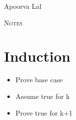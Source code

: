 \documentclass{article}
\begin{document}
\begin{flushright}
Apoorva Lal
\end{flushright}

\begin{center}
\Large \textsc{Notes} \\
\end{center}

\section{Induction} %
\label{sec:induction}

\begin{itemize}
  \item Prove base case
  \item Assume true for k
  \item Prove true for k+1
\end{itemize}
\end{document}
